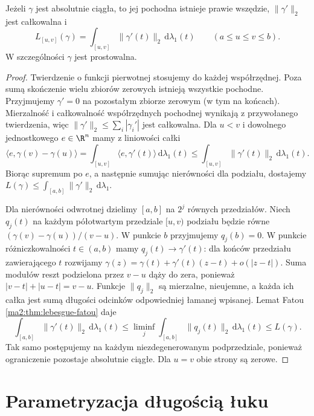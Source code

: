 \begin{twierdzenie}
\label{ma2:thm:curve-ac-length}
Jeżeli $\gamma$ jest absolutnie ciągła, to jej
pochodna istnieje prawie wszędzie, $\|\gamma'\|_2$
jest całkowalna i
\[
 L_{[u,v]}(\gamma)=
 \int_{[u,v]}\|\gamma'(t)\|_2\,\mathrm d\lambda_1(t)
 \qquad(a\le u\le v\le b).
\]
W szczególności $\gamma$ jest prostowalna.
\end{twierdzenie}
\begin{proof}
Twierdzenie o funkcji pierwotnej
stosujemy do każdej współrzędnej. Poza sumą
skończenie wielu zbiorów zerowych istnieją
wszystkie pochodne. Przyjmujemy $\gamma'=0$ na
pozostałym zbiorze zerowym (w tym na końcach).
Mierzalność i całkowalność współrzędnych pochodnej
wynikają z przywołanego twierdzenia, więc
$\|\gamma'\|_2\le\sum_i|\gamma_i'|$ jest całkowalna.
Dla $u<v$ i dowolnego jednostkowego $e\in\R^n$
mamy z liniowości całki
\[
 \langle e,\gamma(v)-\gamma(u)\rangle
 =\int_{[u,v]}\langle e,\gamma'(t)\rangle\,\mathrm d\lambda_1(t)
 \le\int_{[u,v]}\|\gamma'(t)\|_2\,\mathrm d\lambda_1(t).
\]
Biorąc supremum po $e$, a następnie sumując
nierówności dla podziału, dostajemy
$L(\gamma)\le\int_{[a,b]}\|\gamma'\|_2\,\mathrm d\lambda_1$.

Dla nierówności odwrotnej dzielimy $[a,b]$ na
$2^j$ równych przedziałów. Niech $q_j(t)$ na
każdym półotwartym przedziale $[u,v)$ podziału
będzie równe $(\gamma(v)-\gamma(u))/(v-u)$.
W punkcie $b$ przyjmujemy $q_j(b)=0$.
W punkcie różniczkowalności $t\in(a,b)$ mamy
$q_j(t)\to\gamma'(t)$: dla końców przedziału
zawierającego $t$ rozwijamy
$\gamma(z)=\gamma(t)+\gamma'(t)(z-t)+o(|z-t|)$.
Suma modułów reszt podzielona przez $v-u$ dąży
do zera, ponieważ $|v-t|+|u-t|=v-u$.
Funkcje $\|q_j\|_2$ są mierzalne, nieujemne,
a każda ich całka jest sumą długości odcinków
odpowiedniej łamanej wpisanej.
Lemat Fatou \ref{ma2:thm:lebesgue-fatou} daje
\[
 \int_{[a,b]}\|\gamma'(t)\|_2\,\mathrm d\lambda_1(t)
 \le\liminf_j\int_{[a,b]}\|q_j(t)\|_2\,\mathrm d\lambda_1(t)
 \le L(\gamma).
\]
Tak samo postępujemy na każdym niezdegenerowanym
podprzedziale, ponieważ ograniczenie pozostaje
absolutnie ciągłe. Dla $u=v$ obie strony są zerowe.
\end{proof}

\section{Parametryzacja długością łuku}

